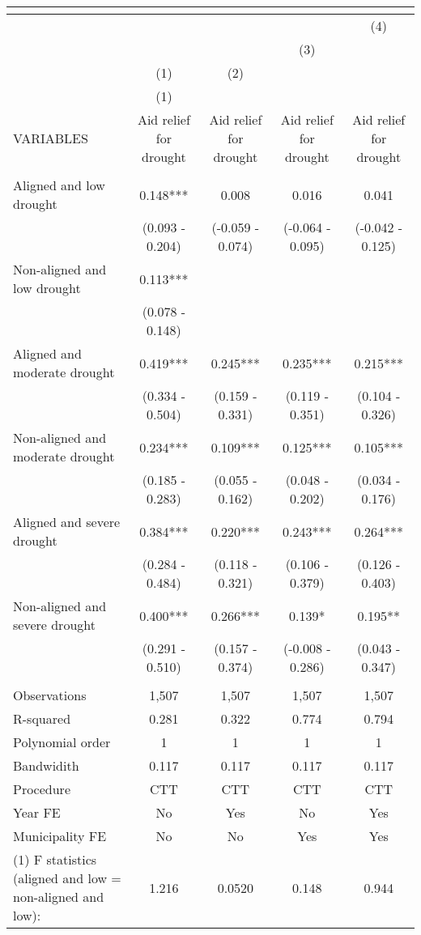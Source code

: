 \begin{tabular}{lcccc}
\multicolumn{5}{c}{} \\ \hline
 &  &  &  & (4) \\
 &  &  & (3) &  \\
 & (1) & (2) &  &  \\
 & (1) &  &  &  \\
VARIABLES & Aid relief for drought & Aid relief for drought & Aid relief for drought & Aid relief for drought \\ \hline
 &  &  &  &  \\
Aligned and low drought & 0.148*** & 0.008 & 0.016 & 0.041 \\
 & (0.093 - 0.204) & (-0.059 - 0.074) & (-0.064 - 0.095) & (-0.042 - 0.125) \\
Non-aligned and low drought & 0.113*** &  &  &  \\
 & (0.078 - 0.148) &  &  &  \\
Aligned and moderate drought & 0.419*** & 0.245*** & 0.235*** & 0.215*** \\
 & (0.334 - 0.504) & (0.159 - 0.331) & (0.119 - 0.351) & (0.104 - 0.326) \\
Non-aligned and moderate drought & 0.234*** & 0.109*** & 0.125*** & 0.105*** \\
 & (0.185 - 0.283) & (0.055 - 0.162) & (0.048 - 0.202) & (0.034 - 0.176) \\
Aligned and severe drought & 0.384*** & 0.220*** & 0.243*** & 0.264*** \\
 & (0.284 - 0.484) & (0.118 - 0.321) & (0.106 - 0.379) & (0.126 - 0.403) \\
Non-aligned and severe drought & 0.400*** & 0.266*** & 0.139* & 0.195** \\
 & (0.291 - 0.510) & (0.157 - 0.374) & (-0.008 - 0.286) & (0.043 - 0.347) \\
 &  &  &  &  \\
Observations & 1,507 & 1,507 & 1,507 & 1,507 \\
R-squared & 0.281 & 0.322 & 0.774 & 0.794 \\
Polynomial order & 1 & 1 & 1 & 1 \\
Bandwidith & 0.117 & 0.117 & 0.117 & 0.117 \\
Procedure & CTT & CTT & CTT & CTT \\
Year FE & No & Yes & No & Yes \\
Municipality FE & No & No & Yes & Yes \\
(1) F statistics (aligned and low = non-aligned and low): & 1.216 & 0.0520 & 0.148 & 0.944 \\

\end{tabular}
